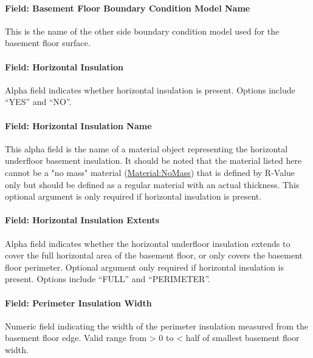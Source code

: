 \paragraph{Field: Basement Floor Boundary Condition Model Name}\label{field-basement-floor-boundary-condition-model-name}

This is the name of the other side boundary condition model used for the basement floor surface.

\paragraph{Field: Horizontal Insulation}\label{field-horizontal-insulation-1}

Alpha field indicates whether horizontal insulation is present. Options include ``YES'' and ``NO''.

\paragraph{Field: Horizontal Insulation Name}\label{field-horizontal-insulation-name}

This alpha field is the name of a material object representing the horizontal underfloor basement insulation. It should be noted that the material listed here cannot be a "no mass" material (\hyperref[materialnomass]{Material:NoMass}) that is defined by R-Value only but should be defined as a regular material with an actual thickness. This optional argument is only required if horizontal insulation is present.

\paragraph{Field: Horizontal Insulation Extents}\label{field-horizontal-insulation-extents-1}

Alpha field indicates whether the horizontal underfloor insulation extends to cover the full horizontal area of the basement floor, or only covers the basement floor perimeter. Optional argument only required if horizontal insulation is present. Options include ``FULL'' and ``PERIMETER''.

\paragraph{Field: Perimeter Insulation Width}\label{field-perimeter-insulation-width-1}

Numeric field indicating the width of the perimeter insulation measured from the basement floor edge. Valid range from \textgreater{} 0 to \textless{} half of smallest basement floor width.


